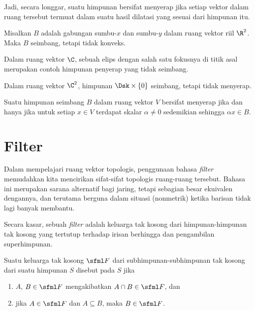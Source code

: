 Jadi, secara longgar, suatu himpunan bersifat menyerap jika setiap vektor dalam ruang tersebut termuat dalam suatu hasil dilatasi yang sesuai dari himpunan itu.

\begin{exam} Misalkan $B$ adalah gabungan sumbu-$x$ dan sumbu-$y$ dalam ruang vektor riil $\R^2$.  Maka $B$ seimbang, tetapi tidak konveks.
\end{exam}

\begin{exam} Dalam ruang vektor $\C$, sebuah elips dengan salah satu fokusnya di titik asal merupakan contoh himpunan penyerap yang tidak seimbang.
\end{exam}

\begin{exam} Dalam ruang vektor $\C^2$, himpunan $\Dsk \times \{0\}$ seimbang, tetapi tidak menyerap.
\end{exam}

\begin{prop} Suatu himpunan seimbang $B$ dalam ruang vektor $V$ bersifat menyerap jika dan hanya jika untuk setiap $x \in V$ terdapat skalar
$\alpha \ne 0$ sedemikian sehingga $\alpha x \in B$.
\end{prop}











\section{Filter}

Dalam mempelajari ruang vektor topologis, penggunaan bahasa \emph{filter} memudahkan kita mencirikan sifat-sifat topologis
ruang-ruang tersebut.  Bahasa ini merupakan sarana alternatif bagi jaring, tetapi sebagian besar ekuivalen dengannya, dan terutama berguna dalam situasi (nonmetrik) ketika barisan
tidak lagi banyak membantu.

Secara kasar, sebuah \emph{filter} adalah keluarga tak kosong dari himpunan-himpunan tak kosong yang tertutup terhadap irisan berhingga dan pengambilan superhimpunan.

\begin{defn} Suatu keluarga tak kosong $\sfml F$ dari subhimpunan-subhimpunan tak kosong dari suatu himpunan $S$ disebut
 pada $S$ jika
   \begin{enumerate}[label=(\alph*)]
     \item $A$, $B \in \sfml F$ mengakibatkan $A \cap B \in \sfml F$, dan
     \item jika $A \in \sfml F$ dan $A \subseteq B$, maka $B \in \sfml F$.
   \end{enumerate}
\end{defn}

